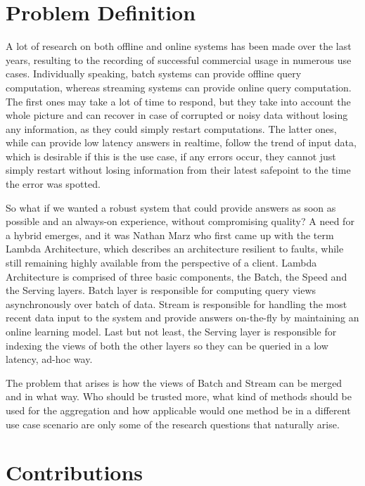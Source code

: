 \documentclass{lmproj}
\begin{document}
\section{Problem Definition}
\label{intro}

A lot of research on both offline and online systems has been made over the last years, resulting to the recording of successful commercial usage in numerous use cases. Individually speaking, batch systems can provide offline query computation, whereas streaming systems can provide online query computation. The first ones may take a lot of time to respond, but they take into account the whole picture and can recover in case of corrupted or noisy data without losing any information, as they could simply restart computations. The latter ones, while can provide low latency answers in realtime, follow the trend of input data, which is desirable if this is the use case, if any errors occur, they cannot just simply restart without losing information from their latest safepoint to the time the error was spotted.

So what if we wanted a robust system that could provide answers as soon as possible and an always-on experience, without compromising quality? A need for a hybrid emerges, and it was Nathan Marz who first came up with the term Lambda Architecture, which describes an architecture resilient to faults, while still remaining highly available from the perspective of a client. Lambda Architecture is comprised of three basic components, the Batch, the Speed and the Serving layers. Batch layer is responsible for computing query views asynchronously over batch of data. Stream is responsible for handling the most recent data input to the system and provide answers on-the-fly by maintaining an online learning model. Last but not least, the Serving layer is responsible for indexing the views of both the other layers so they can be queried in a low latency, ad-hoc way.

The problem that arises is how the views of Batch and Stream can be merged and in what way. Who should be trusted more, what kind of methods should be used for the aggregation and how applicable would one method be in a different use case scenario are only some of the research questions that naturally arise. 

\section{Contributions}
\label{intro}
\end{document}
